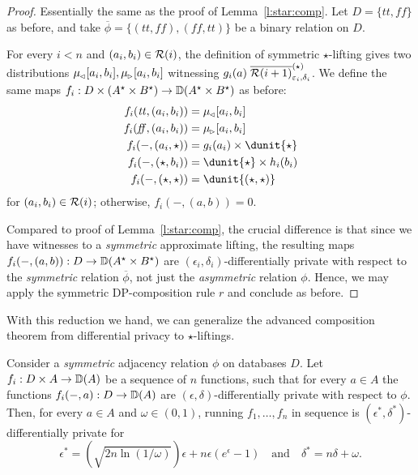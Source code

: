 \documentclass{lmcs}
\begin{document}
\begin{proof}
  Essentially the same as the proof of Lemma~\ref{l:star:comp}. Let $D = \{
    \mathit{tt}, \mathit{ff} \}$ as before, and take $\overline{\phi} = \{
  (\mathit{tt}, \mathit{ff}), (\mathit{ff}, \mathit{tt}) \}$ be a binary
  relation on $D$.
  
  For every $i < n$ and $(a_i, b_i) \in \mathcal{R}(i)$, the definition of symmetric
  $\star$-lifting gives two distributions $\mu_{\mspace{-1.5mu}{\scriptscriptstyle \vartriangleleft}}[a_i, b_i], \mu_{\mspace{-1.5mu}{\scriptscriptstyle \vartriangleright}}[a_i,
  b_i]$ witnessing $g_i(a) \mathrel{\mathrel{\overline{\mathcal{R}(i + 1)}^{(\star)}_{\varepsilon_i,
  \delta_i}}}$. We define the same maps $f_i : D \times (A^\star \times B^\star)
  \to {\mathbb{D}}(A^\star \times B^\star)$ as before:
  \begin{align*}
    f_i(\mathit{tt}, (a_i, b_i)) &= \mu\lside[a_i, b_i] \\
    f_i(\mathit{ff}, (a_i, b_i)) &= \mu\rside[a_i, b_i] \\
    f_i(-, (a_i, \star)) &= g_i(a_i) \times \dunit{\star} \\
    f_i(-, (\star, b_i)) &= \dunit{\star} \times h_i(b_i) \\
    f_i(-, (\star, \star)) &= \dunit{(\star, \star)}
  \end{align*}
  for $(a_i, b_i) \in \mathcal{R}(i)$; otherwise, $f_i(-, (a, b)) = 0$.

  Compared to proof of Lemma~\ref{l:star:comp}, the crucial difference is that
  since we have witnesses to a \emph{symmetric} approximate lifting, the
  resulting maps $f_i(-, (a, b)) : D \to {\mathbb{D}}(A^\star \times B^\star)$ are
  $(\epsilon_i, \delta_i)$-differentially private with respect to the
  \emph{symmetric} relation $\overline{\phi}$, not just the \emph{asymmetric}
  relation $\phi$.  Hence, we may apply the symmetric DP-composition rule $r$
  and conclude as before.
\end{proof}

With this reduction we hand, we can generalize the advanced composition
theorem from differential privacy to $\star$-liftings.

\begin{thm} \label{t:advcomp:priv}
  Consider a \emph{symmetric} adjacency relation $\phi$ on databases $D$.  Let
  $f_i : D \times A \to {\mathbb{D}}(A)$ be a sequence of $n$ functions, such that for
  every $a \in A$ the functions $f_i(-,a) : D \to {\mathbb{D}}(A)$ are $(\epsilon,
  \delta)$-differentially private with respect to $\phi$.  Then, for every $a \in
  A$ and $\omega \in (0, 1)$, running $f_1, \dots, f_n$ in sequence is
  $(\epsilon^*, \delta^*)$-differentially private for
  \[
    \epsilon^* = \left(\sqrt{2 n \ln(1/\omega)}\right) \epsilon +
    n \epsilon(e^\epsilon - 1)
    \quad \text{and} \quad
    \delta^* = n \delta + \omega .
  \]
\end{thm}
\end{document}
